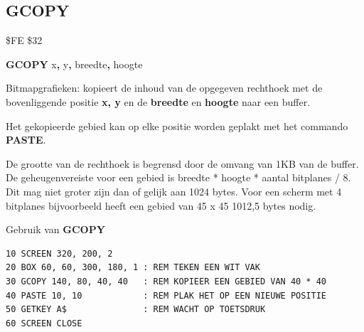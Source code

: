 
\newpage
\subsection{GCOPY}
\begin{description}[leftmargin=2cm,style=nextline]
\item [Token:]    \$FE \$32

\item [Formaat:]   {\bf GCOPY} x{\bf,} y{\bf,} breedte{\bf,} hoogte

\item [Gebruik:]    Bitmapgrafieken: kopieert de inhoud van de opgegeven rechthoek met de bovenliggende positie {\bf x, y} en de {\bf breedte} en {\bf hoogte} naar een buffer.

                  Het gekopieerde gebied kan op elke positie worden geplakt met het commando {\bf PASTE}.

\item [Opmerkingen:]  De grootte van de rechthoek is begrensd door de omvang van 1KB van de buffer. De geheugenvereiste voor een gebied is breedte * hoogte * aantal bitplanes / 8. Dit mag niet groter zijn dan of gelijk aan 1024 bytes. Voor een scherm met 4 bitplanes bijvoorbeeld heeft een gebied van 45 x 45 1012,5 bytes nodig.

\item [Voorbeeld:]  Gebruik van {\bf GCOPY}

\begin{tcolorbox}[colback=black,coltext=white]
\verbatimfont{\codefont}
\begin{verbatim}
10 SCREEN 320, 200, 2
20 BOX 60, 60, 300, 180, 1 : REM TEKEN EEN WIT VAK
30 GCOPY 140, 80, 40, 40   : REM KOPIEER EEN GEBIED VAN 40 * 40
40 PASTE 10, 10            : REM PLAK HET OP EEN NIEUWE POSITIE
50 GETKEY A$               : REM WACHT OP TOETSDRUK
60 SCREEN CLOSE
\end{verbatim}
\end{tcolorbox}
\end{description}


\newpage
